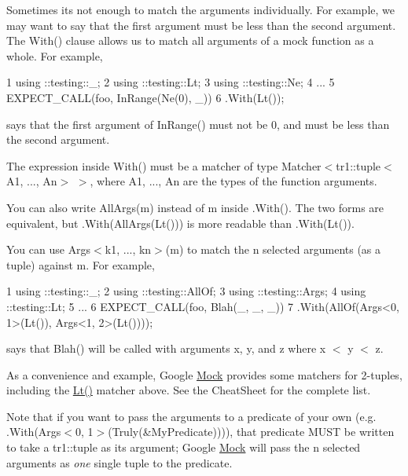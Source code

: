 Sometimes it\textquotesingle{}s not enough to match the arguments individually. For example, we may want to say that the first argument must be less than the second argument. The {\ttfamily With()} clause allows us to match all arguments of a mock function as a whole. For example,


\begin{DoxyCode}
1 using ::testing::\_;
2 using ::testing::Lt;
3 using ::testing::Ne;
4 ...
5   EXPECT\_CALL(foo, InRange(Ne(0), \_))
6       .With(Lt());
\end{DoxyCode}


says that the first argument of {\ttfamily In\+Range()} must not be 0, and must be less than the second argument.

The expression inside {\ttfamily With()} must be a matcher of type {\ttfamily Matcher$<$tr1\+::tuple$<$A1, ..., An$>$ $>$}, where {\ttfamily A1}, ..., {\ttfamily An} are the types of the function arguments.

You can also write {\ttfamily All\+Args(m)} instead of {\ttfamily m} inside {\ttfamily .With()}. The two forms are equivalent, but {\ttfamily .With(All\+Args(\+Lt()))} is more readable than {\ttfamily .With(\+Lt())}.

You can use {\ttfamily Args$<$k1, ..., kn$>$(m)} to match the {\ttfamily n} selected arguments (as a tuple) against {\ttfamily m}. For example,


\begin{DoxyCode}
1 using ::testing::\_;
2 using ::testing::AllOf;
3 using ::testing::Args;
4 using ::testing::Lt;
5 ...
6   EXPECT\_CALL(foo, Blah(\_, \_, \_))
7       .With(AllOf(Args<0, 1>(Lt()), Args<1, 2>(Lt())));
\end{DoxyCode}


says that {\ttfamily Blah()} will be called with arguments {\ttfamily x}, {\ttfamily y}, and {\ttfamily z} where {\ttfamily x $<$ y $<$ z}.

As a convenience and example, Google \hyperlink{class_mock}{Mock} provides some matchers for 2-\/tuples, including the {\ttfamily \hyperlink{namespacetesting_ad621459957a8bcdd3c256b7940ecbf99}{Lt()}} matcher above. See the Cheat\+Sheet for the complete list.

Note that if you want to pass the arguments to a predicate of your own (e.\+g. {\ttfamily .With(Args$<$0, 1$>$(Truly(\&\+My\+Predicate)))}), that predicate M\+U\+ST be written to take a {\ttfamily tr1\+::tuple} as its argument; Google \hyperlink{class_mock}{Mock} will pass the {\ttfamily n} selected arguments as {\itshape one} single tuple to the predicate.


